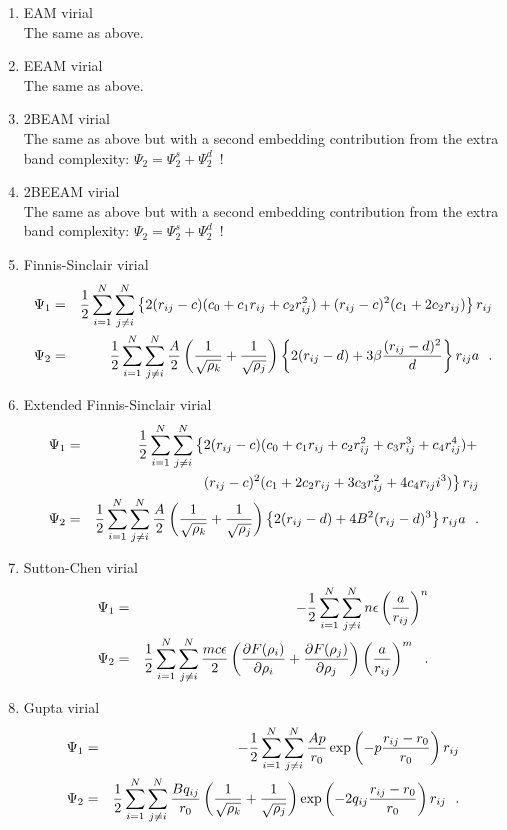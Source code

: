 \begin{enumerate}
\item EAM virial \\
The same as above.
\item EEAM virial \\
The same as above.
\item 2BEAM virial \\
The same as above but with a second embedding contribution from the extra band complexity:
$\Psi_{2}=\Psi^{s}_{2}+\Psi^{d}_{2}$~!
\item 2BEEAM virial \\
The same as above but with a second embedding contribution from the extra band complexity:
$\Psi_{2}=\Psi^{s}_{2}+\Psi^{d}_{2}$~!
\item Finnis-Sinclair virial
\begin{eqnarray}
\Psi_{1} &=& {1 \over 2} \sum_{i=1}^{N} \sum_{j \ne i}^{N}
\left\{ 2 (r_{ij}-c) (c_{0}+c_{1}r_{ij}+c_{2}r_{ij}^{2}) +
(r_{ij}-c)^{2} (c_{1}+2c_{2}r_{ij}) \right\} r_{ij} \nonumber \\
\Psi_{2} &=& {1 \over 2} \sum_{i=1}^{N} \sum_{j \ne i}^{N}
{A \over 2} \left( {1 \over \sqrt{\rho_{k}}} + {1 \over \sqrt{\rho_{j}}} \right)
\left\{ 2(r_{ij}-d) + 3 \beta \frac{(r_{ij}-d)^{2}}{d} \right\} r_{ij}a~~.
\end{eqnarray}
\item Extended Finnis-Sinclair virial
\begin{eqnarray}
\Psi_{1} &=& {1 \over 2} \sum_{i=1}^{N} \sum_{j \ne i}^{N}
\left\{ 2 (r_{ij}-c) (c_{0}+c_{1}r_{ij}+c_{2}r_{ij}^{2}+c_{3}r_{ij}^{3}+c_{4}r_{ij}^{4}) + \right. \nonumber \\
& & \phantom{xxxxxxxx} \left. (r_{ij}-c)^{2} (c_{1}+2c_{2}r_{ij}+3c_{3}r_{ij}^{2}+4c_{4}r_{ij}i^{3}) \right\} r_{ij} \\
\Psi_{2} &=& {1 \over 2} \sum_{i=1}^{N} \sum_{j \ne i}^{N}
{A \over 2} \left( {1 \over \sqrt{\rho_{k}}} + {1 \over \sqrt{\rho_{j}}} \right)
\left\{ 2(r_{ij}-d) + 4 B^{2} (r_{ij}-d)^{3} \right\} r_{ij}a~~. \nonumber
\end{eqnarray}
\item Sutton-Chen virial
\begin{eqnarray}
\Psi_{1} &=& -{1 \over 2} \sum_{i=1}^{N} \sum_{j \ne i}^{N} n \epsilon \left( \frac{a}{r_{ij}} \right)^{n} \nonumber \\
\Psi_{2} &=& {1 \over 2} \sum_{i=1}^{N} \sum_{j \ne i}^{N} \frac{m c \epsilon}{2} \left( \frac{\partial F(\rho_{i})}{\partial \rho_{i}} +
\frac{\partial F(\rho_{j})}{\partial \rho_{j}} \right) \left( \frac{a}{r_{ij}} \right)^{m}~~.
\end{eqnarray}
\item Gupta virial
\begin{eqnarray}
\Psi_{1} &=& -{1 \over 2} \sum_{i=1}^{N} \sum_{j \ne i}^{N}
\frac{A p}{r_{0}} \exp \left( -p \frac{r_{ij}-r_{0}}{r_{0}} \right) r_{ij} \nonumber \\
\Psi_{2} &=& {1 \over 2} \sum_{i=1}^{N} \sum_{j \ne i}^{N} \frac{B q_{ij}}{r_{0}}
\left( {1 \over \sqrt{\rho_{k}}} + {1 \over \sqrt{\rho_{j}}} \right)
\exp \left( -2 q_{ij} \frac{r_{ij}-r_{0}}{r_{0}} \right) r_{ij}~~.
\end{eqnarray}
\end{enumerate}

